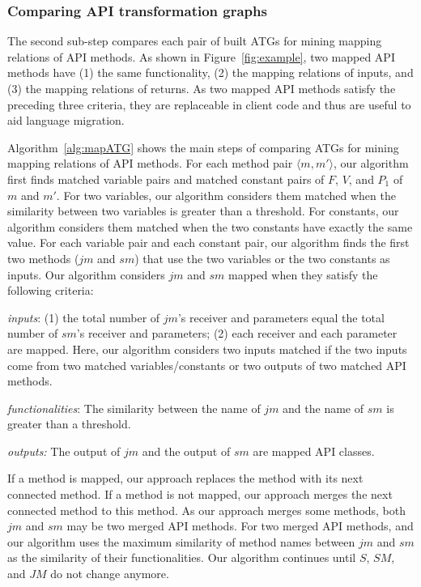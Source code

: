 \subsubsection{Comparing API transformation graphs} The
second sub-step compares each pair of built ATGs for mining mapping
relations of API methods. As shown in Figure~\ref{fig:example}, two
mapped API methods have (1) the same functionality, (2) the mapping
relations of inputs, and (3) the mapping relations of returns. As
two mapped API methods satisfy the preceding three criteria, they
are replaceable in client code and thus are useful to aid language
migration.

Algorithm~\ref{alg:mapATG} shows the main steps of comparing ATGs
for mining mapping relations of API methods. For each method pair
$\langle m, m'\rangle$, our algorithm first finds matched variable
pairs and matched constant pairs of $F$, $V$, and $P_1$ of $m$ and
$m'$. For two variables, our algorithm considers them matched when
the similarity between two variables is greater than a threshold.
For constants, our algorithm considers them matched when the two
constants have exactly the same value. For each variable pair and
each constant pair, our algorithm finds the first two methods ($jm$
and $sm$) that use the two variables or the two constants as inputs.
Our algorithm considers $jm$ and $sm$ mapped when they satisfy the
following criteria:

\emph{inputs}: (1) the total number of $jm$'s receiver and
parameters equal the total number of $sm$'s receiver and parameters;
(2) each receiver and each parameter are mapped. Here, our algorithm
considers two inputs matched if the two inputs come from two matched
variables/constants or two outputs of two matched API methods.

\emph{functionalities}: The similarity between the name of $jm$ and
the name of $sm$ is greater than a threshold.

\emph{outputs:} The output of $jm$ and the output of $sm$ are mapped
API classes.

If a method is mapped, our approach replaces the method with its
next connected method. If a method is not mapped, our approach
merges the next connected method to this method. As our approach
merges some methods, both $jm$ and $sm$ may be two merged API
methods. For two merged API methods, and our algorithm uses the
maximum similarity of method names between $jm$ and $sm$ as the
similarity of their functionalities. Our algorithm continues until
$S$, $SM$, and $JM$ do not change anymore.


